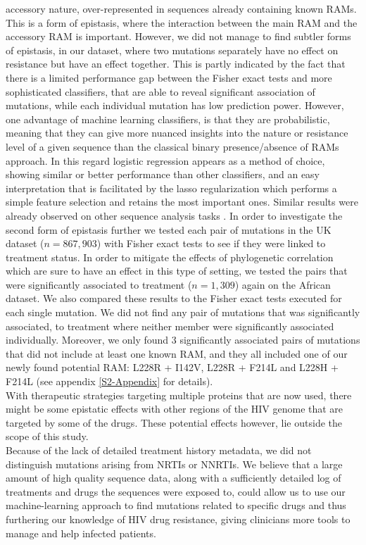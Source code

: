 \documentclass[
  11,
]{scrbook}
\begin{document}
accessory nature, over-represented in sequences already containing known
RAMs. This is a form of epistasis, where the interaction between the
main RAM and the accessory RAM is important. However, we did not manage
to find subtler forms of epistasis, in our dataset, where two mutations
separately have no effect on resistance but have an effect together.
This is partly indicated by the fact that there is a limited performance
gap between the Fisher exact tests and more sophisticated classifiers,
that are able to reveal significant association of mutations, while each
individual mutation has low prediction power. However, one advantage of
machine learning classifiers, is that they are probabilistic, meaning
that they can give more nuanced insights into the nature or resistance
level of a given sequence than the classical binary presence/absence of
RAMs approach. In this regard logistic regression appears as a method of
choice, showing similar or better performance than other classifiers,
and an easy interpretation that is facilitated by the lasso
regularization which performs a simple feature selection and retains the
most important ones. Similar results were already observed on other
sequence analysis tasks \autocite{wuGenomewideAssociationAnalysis2009}. In order
to investigate the second form of epistasis further we tested each pair
of mutations in the UK dataset (\(n=867,903\)) with Fisher exact tests to
see if they were linked to treatment status. In order to mitigate the
effects of phylogenetic correlation which are sure to have an effect in
this type of setting, we tested the pairs that were significantly
associated to treatment (\(n=1,309\)) again on the African dataset. We
also compared these results to the Fisher exact tests executed for each
single mutation. We did not find any pair of mutations that was
significantly associated, to treatment where neither member were
significantly associated individually. Moreover, we only found 3
significantly associated pairs of mutations that did not include at
least one known RAM, and they all included one of our newly found
potential RAM: L228R + I142V, L228R + F214L and L228H + F214L (see appendix \ref{S2-Appendix} for
details).\\
With therapeutic strategies targeting multiple proteins that are now
used, there might be some epistatic effects with other regions of the
HIV genome that are targeted by some of the drugs. These potential
effects however, lie outside the scope of this study.\\
Because of the lack of detailed treatment history metadata, we did not
distinguish mutations arising from NRTIs or NNRTIs. We believe that a
large amount of high quality sequence data, along with a sufficiently
detailed log of treatments and drugs the sequences were exposed to,
could allow us to use our machine-learning approach to find mutations
related to specific drugs and thus furthering our knowledge of HIV drug
resistance, giving clinicians more tools to manage and help infected
patients.
\end{document}
